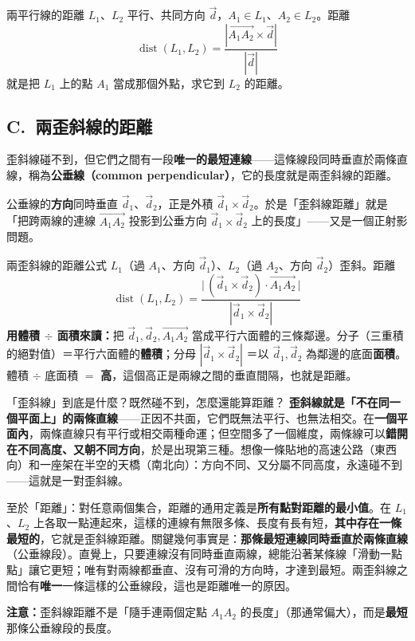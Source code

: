 \documentclass[11pt]{article}
\begin{document}
\begin{補充框}{兩平行線的距離}
$L_1$、$L_2$ 平行、共同方向 $\vec d$，$A_1\in L_1$、$A_2\in L_2$。距離
$$\boxed{\;\operatorname{dist}(L_1,L_2)=\frac{|\vec{A_1A_2}\times\vec d|}{|\vec d|}\;}$$
就是把 $L_1$ 上的點 $A_1$ 當成那個外點，求它到 $L_2$ 的距離。
\end{補充框}

\subsection*{\sffamily C.\ 兩歪斜線的距離}

歪斜線碰不到，但它們之間有一段\textbf{唯一的最短連線}——這條線段同時垂直於兩條直線，稱為\textbf{公垂線（common perpendicular）}，它的長度就是兩歪斜線的距離。


公垂線的\textbf{方向}同時垂直 $\vec d_1$、$\vec d_2$，正是外積 $\vec d_1\times\vec d_2$。於是「歪斜線距離」就是「把跨兩線的連線 $\vec{A_1A_2}$ 投影到公垂方向 $\vec d_1\times\vec d_2$ 上的長度」——又是一個正射影問題。

\begin{補充框}{兩歪斜線的距離公式}
$L_1$（過 $A_1$、方向 $\vec d_1$）、$L_2$（過 $A_2$、方向 $\vec d_2$）歪斜。距離
$$\boxed{\;\operatorname{dist}(L_1,L_2)=\frac{\bigl|\,(\vec d_1\times\vec d_2)\cdot\vec{A_1A_2}\,\bigr|}{|\vec d_1\times\vec d_2|}\;}$$
\textbf{用體積 $\div$ 面積來讀：}把 $\vec d_1,\vec d_2,\vec{A_1A_2}$ 當成平行六面體的三條鄰邊。分子（三重積的絕對值）＝平行六面體的\textbf{體積}；分母 $|\vec d_1\times\vec d_2|$ ＝以 $\vec d_1,\vec d_2$ 為鄰邊的底面\textbf{面積}。體積 $\div$ 底面積 $=$ \textbf{高}，這個高正是兩線之間的垂直間隔，也就是距離。
\end{補充框}

\begin{補充框}{「歪斜線」到底是什麼？既然碰不到，怎麼還能算距離？}
\textbf{歪斜線就是「不在同一個平面上」的兩條直線}——正因不共面，它們既無法平行、也無法相交。在\textbf{一個平面內}，兩條直線只有平行或相交兩種命運；但空間多了一個維度，兩條線可以\textbf{錯開在不同高度、又朝不同方向}，於是出現第三種。想像一條貼地的高速公路（東西向）和一座架在半空的天橋（南北向）：方向不同、又分屬不同高度，永遠碰不到——這就是一對歪斜線。

至於「距離」：對任意兩個集合，距離的通用定義是\textbf{所有點對距離的最小值}。在 $L_1$、$L_2$ 上各取一點連起來，這樣的連線有無限多條、長度有長有短，\textbf{其中存在一條最短的}，它就是歪斜線距離。關鍵幾何事實是：\textbf{那條最短連線同時垂直於兩條直線}（公垂線段）。直覺上，只要連線沒有同時垂直兩線，總能沿著某條線「滑動一點點」讓它更短；唯有對兩線都垂直、沒有可滑的方向時，才達到最短。兩歪斜線之間恰有\textbf{唯一}一條這樣的公垂線段，這也是距離唯一的原因。

\textbf{注意：}歪斜線距離不是「隨手連兩個定點 $A_1A_2$ 的長度」（那通常偏大），而是\textbf{最短}那條公垂線段的長度。
\end{補充框}
\end{document}
